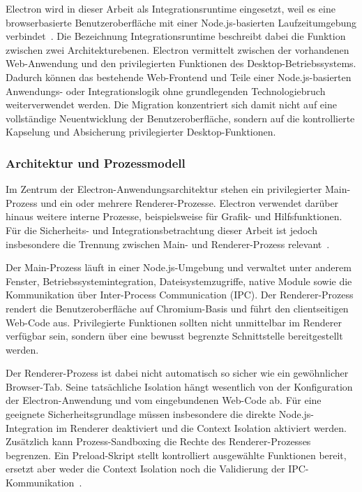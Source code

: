 Electron wird in dieser Arbeit als Integrationsruntime eingesetzt, weil es eine browserbasierte Benutzeroberfläche mit einer Node.js-basierten Laufzeitumgebung verbindet~\cite{electron2026process}.
Die Bezeichnung Integrationsruntime beschreibt dabei die Funktion zwischen zwei Architekturebenen.
Electron vermittelt zwischen der vorhandenen Web-Anwendung und den privilegierten Funktionen des Desktop-Betriebssystems.
Dadurch können das bestehende Web-Frontend und Teile einer Node.js-basierten Anwendungs- oder Integrationslogik ohne grundlegenden Technologiebruch weiterverwendet werden.
Die Migration konzentriert sich damit nicht auf eine vollständige Neuentwicklung der Benutzeroberfläche, sondern auf die kontrollierte Kapselung und Absicherung privilegierter Desktop-Funktionen.

\subsubsection{Architektur und Prozessmodell}
Im Zentrum der Electron-Anwendungsarchitektur stehen ein privilegierter Main-Prozess und ein oder mehrere Renderer-Prozesse.
Electron verwendet darüber hinaus weitere interne Prozesse, beispielsweise für Grafik- und Hilfsfunktionen.
Für die Sicherheits- und Integrationsbetrachtung dieser Arbeit ist jedoch insbesondere die Trennung zwischen Main- und Renderer-Prozess relevant~\cite{electron2026process}.

Der Main-Prozess läuft in einer Node.js-Umgebung und verwaltet unter anderem Fenster, Betriebssystemintegration, Dateisystemzugriffe, native Module sowie die Kommunikation über Inter-Process Communication (IPC).
Der Renderer-Prozess rendert die Benutzeroberfläche auf Chromium-Basis und führt den clientseitigen Web-Code aus.
Privilegierte Funktionen sollten nicht unmittelbar im Renderer verfügbar sein, sondern über eine bewusst begrenzte Schnittstelle bereitgestellt werden.

Der Renderer-Prozess ist dabei nicht automatisch so sicher wie ein gewöhnlicher Browser-Tab.
Seine tatsächliche Isolation hängt wesentlich von der Konfiguration der Electron-Anwendung und vom eingebundenen Web-Code ab.
Für eine geeignete Sicherheitsgrundlage müssen insbesondere die direkte Node.js-Integration im Renderer deaktiviert und die Context Isolation aktiviert werden.
Zusätzlich kann Prozess-Sandboxing die Rechte des Renderer-Prozesses begrenzen.
Ein Preload-Skript stellt kontrolliert ausgewählte Funktionen bereit, ersetzt aber weder die Context Isolation noch die Validierung der IPC-Kommunikation~\cite{electron2026security}.

